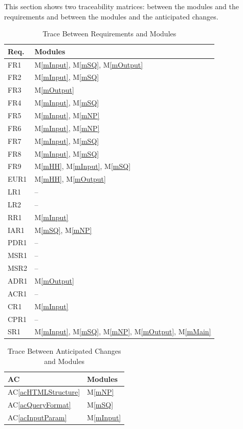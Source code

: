 \documentclass[12pt, titlepage]{article}
\newcommand{\acref}[1]{AC\ref{#1}}
\newcommand{\mref}[1]{M\ref{#1}}
\begin{document}
This section shows two traceability matrices: between the modules and the
requirements and between the modules and the anticipated changes.

\begin{table}[H]
\centering
\begin{tabular}{p{} p{}}
\toprule
\textbf{Req.} & \textbf{Modules}\\
\midrule
FR1 & \mref{mInput}, \mref{mSQ}, \mref{mOutput}\\
FR2 & \mref{mInput}, \mref{mSQ}\\
FR3 & \mref{mOutput}\\
FR4 & \mref{mInput}, \mref{mSQ}\\
FR5 & \mref{mInput}, \mref{mNP}\\
FR6 & \mref{mInput}, \mref{mNP}\\
FR7 & \mref{mInput}, \mref{mSQ}\\
FR8 & \mref{mInput}, \mref{mSQ}\\
FR9 & \mref{mHH}, \mref{mInput}, \mref{mSQ}\\
EUR1 & \mref{mHH}, \mref{mOutput}\\
LR1 & --\\
LR2 & --\\
RR1 & \mref{mInput}\\
IAR1 & \mref{mSQ}, \mref{mNP}\\
PDR1 & --\\
MSR1 & --\\
MSR2 & --\\
ADR1 & \mref{mOutput}\\
ACR1 & --\\
CR1 & \mref{mInput}\\
CPR1 & --\\
SR1 & \mref{mInput}, \mref{mSQ}, \mref{mNP}, \mref{mOutput}, \mref{mMain}\\
\bottomrule
\end{tabular}
\caption{Trace Between Requirements and Modules}
\label{TblRT}
\end{table}

\begin{table}[H]
\centering
\begin{tabular}{p{} p{}}
\toprule
\textbf{AC} & \textbf{Modules}\\
\midrule
\acref{acHTMLStructure} & \mref{mNP}\\
\acref{acQueryFormat} & \mref{mSQ}\\
\acref{acInputParam} & \mref{mInput}\\
\bottomrule
\end{tabular}
\caption{Trace Between Anticipated Changes and Modules}
\label{table:tracechanges}
\label{TblACT}
\end{table}
\end{document}
